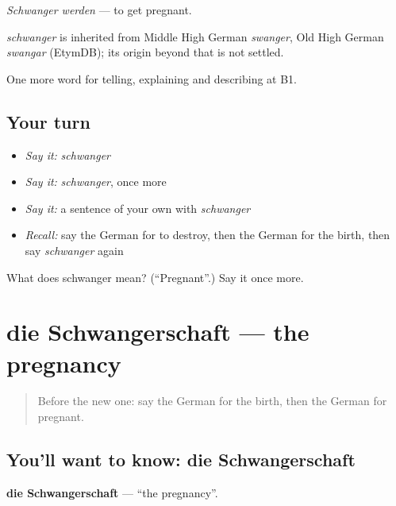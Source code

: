 \emph{Schwanger werden} — to get pregnant.

\begin{cousinweb}
\emph{schwanger} is inherited from Middle High German \emph{swanger}, Old High German \emph{swangar} (EtymDB); its origin beyond that is not settled.
\end{cousinweb}

\begin{grammarlens}[title={What you've built}]
One more word for telling, explaining and describing at B1.
\end{grammarlens}

\subsection*{Your turn}
\begin{itemize}
\raggedright
  \item \emph{Say it:} \emph{schwanger}
  \item \emph{Say it:} \emph{schwanger}, once more
  \item \emph{Say it:} a sentence of your own with \emph{schwanger}
  \item \emph{Recall:} say the German for to destroy, then the German for the birth, then say \emph{schwanger} again
\end{itemize}

\begin{tcolorbox}[breakable,colback=teal!4,colframe=teal!35!black,title={Before you move on}]
What does schwanger mean? (\textquotedblleft{}Pregnant\textquotedblright{}.) Say it once more.
\end{tcolorbox}
\section[die Schwangerschaft]{die Schwangerschaft — the pregnancy}

\label{lesson:GE-C296-schwangerschaft}



\begin{quote}
Before the new one: say the German for the birth, then the German for pregnant.
\end{quote}

\subsection*{You'll want to know: die Schwangerschaft}
\textbf{die Schwangerschaft} — \textquotedblleft{}the pregnancy\textquotedblright{}.

